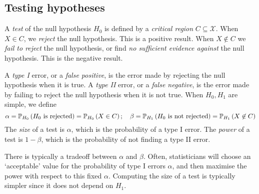 \subsection{Testing hypotheses}
\begin{definition}
	A \textit{test} of the null hypothesis \( H_0 \) is defined by a \textit{critical region} \( C \subseteq \mathcal X \).
	When \( X \in C \), we \textit{reject} the null hypothesis.
	This is a positive result.
	When \( X \not\in C \) we \textit{fail to reject} the null hypothesis, or find \textit{no sufficient evidence against} the null hypothesis.
	This is the negative result.

	A \textit{type I} error, or a \textit{false positive}, is the error made by rejecting the null hypothesis when it is true.
	A \textit{type II} error, or a \textit{false negative}, is the error made by failing to reject the null hypothesis when it is not true.
	When \( H_0, H_1 \) are simple, we define
	\[
		\alpha = \mathbb{P}_{H_0}\left({H_0 \text{ is rejected}}\right) = \mathbb{P}_{H_0}\left({X \in C}\right);\quad \beta = \mathbb{P}_{H_1}\left({H_0 \text{ is not rejected}}\right) = \mathbb{P}_{H_1}\left({X \not\in C}\right)
	\]
	The \textit{size} of a test is \( \alpha \), which is the probability of a type I error.
	The \textit{power} of a test is \( 1 - \beta \), which is the probability of not finding a type II error.

	There is typically a tradeoff between \( \alpha \) and \( \beta \).
	Often, statisticians will choose an `acceptable' value for the probability of type I errors \( \alpha \), and then maximise the power with respect to this fixed \( \alpha \).
	Computing the size of a test is typically simpler since it does not depend on \( H_1 \).
\end{definition}

